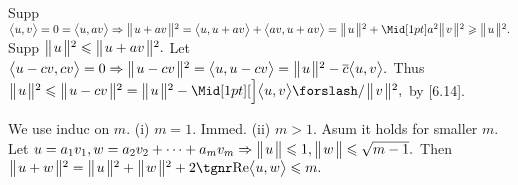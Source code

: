 

\vspace{4pt}

\SepLine

Supp $\Ang{u,v}=0=\Ang{u,av}\Rightarrow\Dvert{u+av}{^2}=\Ang{u,u+av}+\Ang{av,u+av}=\Dvert{u}{^2}+\aMid{a}{^2}\Dvert{v}{^2}\geqslant\Dvert{u}{^2}.$\vspace{2pt}\parSol{}
Supp $\big\Vert\hspace{1pt}{u}\hspace{1pt}\big\Vert{^2}\leqslant\big\Vert\hspace{1pt}{u+av}\hspace{1pt}\big\Vert{^2}.$ Let $\big\langle{u-cv,cv}\big\rangle=0\Rightarrow\big\Vert\hspace{1pt}{u-cv}\hspace{1pt}\big\Vert{^2}=\big\langle{u,u-cv}\big\rangle=\big\Vert\hspace{1pt}{u}\hspace{1pt}\big\Vert{^2}-\overline{c}\big\langle{u,v}\big\rangle.$\parSol{}
Thus $\Dvert{u}{^2}\leqslant\Dvert{u-cv}{^2}=\Dvert{u}{^2}-\aXMid{\Ang{u,v}}{\;\!\XSlash\;\!}\Dvert{v}{^2},$ by [6.14].\PfEnd
\SepLine



\SepLine

We use induc on $m.$ (i) $m=1.$ Immed. (ii) $m>1.$ Asum it holds for smaller $m.$\parSol{}
Let $u=a_1v_1,w=a_2v_2+\dots+a_mv_m\Rightarrow\big\Vert\hspace{1pt}{u}\hspace{1pt}\big\Vert\leqslant1,\big\Vert\hspace{1pt}{w}\hspace{1pt}\big\Vert\leqslant\sqrt{m-1}.$\parSol{}
Then $\Dvert{u+w}{^2}=\Dvert{u}{^2}+\Dvert{w}{^2}+2\REAL\Ang{u,w}\leqslant m.$
\SepLine


\ChEnd\pagebreak


\ChEnd\pagebreak


\ChEnd\pagebreak


\ChEnd\pagebreak


\ChEnd